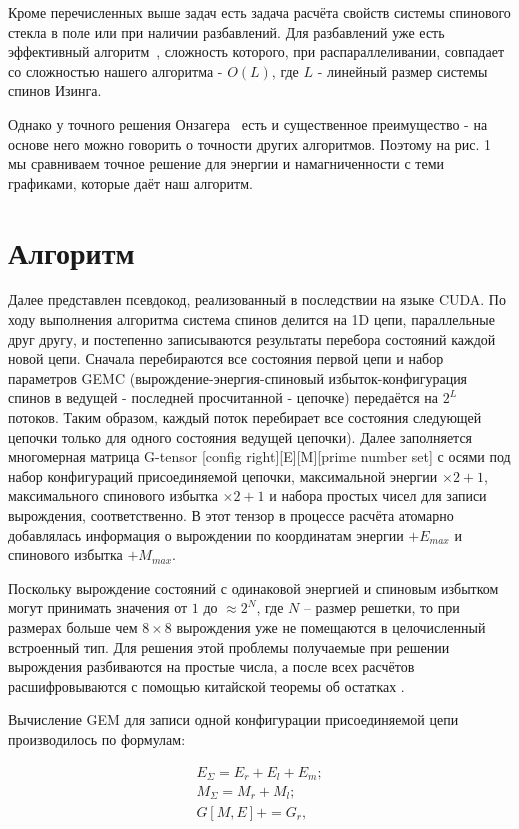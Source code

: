\documentclass[10pt]{article}
\begin{document}
	Кроме перечисленных выше задач есть задача расчёта свойств системы спинового стекла в поле или при наличии разбавлений. Для разбавлений уже есть эффективный алгоритм~\cite{loh2006efficient}, сложность которого, при распараллеливании, совпадает со сложностью нашего алгоритма - $O(L)$, где $L$ - линейный размер системы спинов Изинга.
	
	Однако у точного решения Онзагера~\cite{onsager1944crystal} есть и существенное преимущество - на основе него можно говорить о точности других алгоритмов. Поэтому на рис. 1 мы сравниваем точное решение для энергии и намагниченности с теми графиками, которые даёт наш алгоритм.
	
	\section{Алгоритм}
	Далее представлен псевдокод, реализованный в последствии на языке CUDA. По ходу выполнения алгоритма система спинов делится на 1D цепи, параллельные друг другу, и постепенно записываются результаты перебора состояний каждой новой цепи. Сначала перебираются все состояния первой цепи и набор параметров GEMC (вырождение-энергия-спиновый избыток-конфигурация спинов в ведущей - последней просчитанной - цепочке) передаётся на $2^L$ потоков. Таким образом, каждый поток перебирает все состояния следующей цепочки только для одного состояния ведущей цепочки). Далее заполняется многомерная матрица G-tensor [config right][E][M][prime number set] с осями под набор конфигураций присоединяемой цепочки, максимальной энергии $\times 2 + 1$, максимального спинового избытка $\times 2 + 1$ и набора простых чисел для записи вырождения, соответственно. В этот тензор в процессе расчёта атомарно добавлялась информация о вырождении по координатам энергии $+ E_{max}$ и спинового избытка $+ M_{max}$.
	
	Поскольку вырождение состояний с одинаковой энергией и спиновым избытком могут принимать значения от $1$ до $\approx 2^{N}$, где $N$ -- размер решетки, то при размерах больше чем $8 \times 8$ вырождения уже не помещаются в целочисленный встроенный тип. Для решения этой проблемы получаемые при решении вырождения разбиваются на простые числа, а после всех расчётов расшифровываются с помощью китайской теоремы об остатках \cite{katz2007mathematics}.
	
	Вычисление GEM для записи одной конфигурации присоединяемой цепи производилось по формулам:
	
	\begin{equation}
		\begin{split}
		E_\Sigma = E_r + E_l + E_m; \\
		M_\Sigma = M_r + M_l; \\
		G[M, E] += G_r,
		\end{split}
	\end{equation}
	
\end{document}
